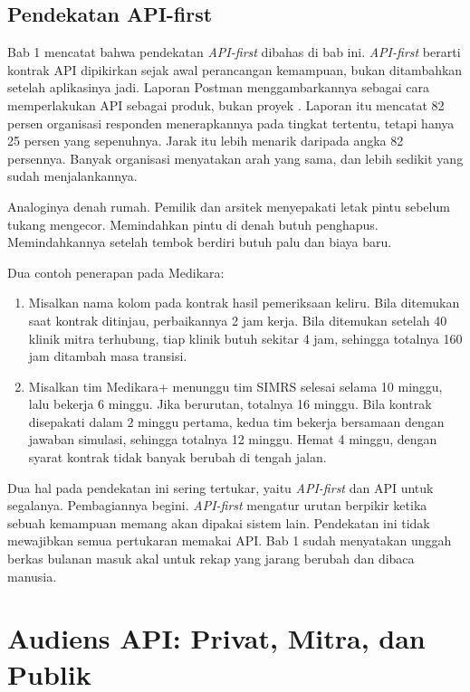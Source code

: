 \subsection*{Pendekatan API-first}

Bab 1 mencatat bahwa pendekatan \textit{API-first} dibahas di bab ini. \textit{API-first} berarti kontrak
API dipikirkan sejak awal perancangan kemampuan, bukan ditambahkan setelah aplikasinya jadi. Laporan
Postman menggambarkannya sebagai cara memperlakukan API sebagai produk, bukan proyek \cite{postman2025}.
Laporan itu mencatat 82 persen organisasi responden menerapkannya pada tingkat tertentu, tetapi hanya
25 persen yang sepenuhnya. Jarak itu lebih menarik daripada angka 82 persennya. Banyak organisasi
menyatakan arah yang sama, dan lebih sedikit yang sudah menjalankannya.

Analoginya denah rumah. Pemilik dan arsitek menyepakati letak pintu sebelum tukang mengecor. Memindahkan
pintu di denah butuh penghapus. Memindahkannya setelah tembok berdiri butuh palu dan biaya baru.

Dua contoh penerapan pada Medikara:
\begin{enumerate}
  \item Misalkan nama kolom pada kontrak hasil pemeriksaan keliru. Bila ditemukan saat kontrak ditinjau,
        perbaikannya 2 jam kerja. Bila ditemukan setelah 40 klinik mitra terhubung, tiap klinik butuh
        sekitar 4 jam, sehingga totalnya 160 jam ditambah masa transisi.
  \item Misalkan tim Medikara+ menunggu tim SIMRS selesai selama 10 minggu, lalu bekerja 6 minggu. Jika
        berurutan, totalnya 16 minggu. Bila kontrak disepakati dalam 2 minggu pertama, kedua tim bekerja
        bersamaan dengan jawaban simulasi, sehingga totalnya 12 minggu. Hemat 4 minggu, dengan syarat
        kontrak tidak banyak berubah di tengah jalan.
\end{enumerate}

Dua hal pada pendekatan ini sering tertukar, yaitu \textit{API-first} dan API untuk segalanya.
Pembagiannya begini. \textit{API-first} mengatur urutan berpikir ketika sebuah kemampuan memang akan
dipakai sistem lain. Pendekatan ini tidak mewajibkan semua pertukaran memakai API. Bab 1 sudah
menyatakan unggah berkas bulanan masuk akal untuk rekap yang jarang berubah dan dibaca manusia.

\section{Audiens API: Privat, Mitra, dan Publik}

